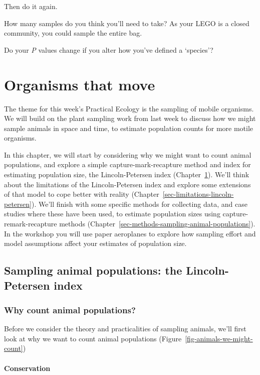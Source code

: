 \documentclass[
  letterpaper,
  DIV=11,
  numbers=noendperiod]{scrreprt}
\begin{document}
Then do it again.

How many samples do you think you'll need to take? As your LEGO is a
closed community, you could sample the entire bag.

Do your \emph{P} values change if you alter how you've defined a
`species'?

\part{Organisms that move}

The theme for this week's Practical Ecology is the sampling of mobile
organisms. We will build on the plant sampling work from last week to
discuss how we might sample animals in space and time, to estimate
population counts for more motile organisms.

In this chapter, we will start by considering why we might want to count
animal populations, and explore a simple capture-mark-recapture method
and index for estimating population size, the Lincoln-Petersen index
(Chapter~\ref{sec-lincoln-petersen}). We'll think about the limitations
of the Lincoln-Petersen index and explore some extensions of that model
to cope better with reality
(Chapter~\ref{sec-limitations-lincoln-petersen}). We'll finish with some
specific methods for collecting data, and case studies where these have
been used, to estimate population sizes using capture-remark-recapture
methods (Chapter~\ref{sec-methods-sampling-animal-populations}). In the
workshop you will use paper aeroplanes to explore how sampling effort
and model assumptions affect your estimates of population size.

\chapter{Sampling animal populations: the Lincoln-Petersen
index}\label{sec-lincoln-petersen}

\section{Why count animal
populations?}\label{why-count-animal-populations}

Before we consider the theory and practicalities of sampling animals,
we'll first look at why we want to count animal populations
(Figure~\ref{fig-animals-we-might-count})

\subsection{Conservation}\label{conservation}
\end{document}
